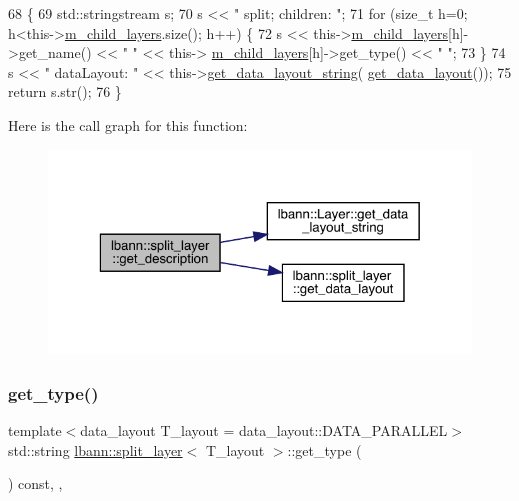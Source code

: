 \begin{DoxyCode}
68                                              \{
69     std::stringstream s;
70     s << \textcolor{stringliteral}{" split; children: "};
71     \textcolor{keywordflow}{for} (\textcolor{keywordtype}{size\_t} h=0; h<this->\hyperlink{classlbann_1_1Layer_ae348c0d2b4d05f74d809d09debb633c0}{m\_child\_layers}.size(); h++) \{
72       s << this->\hyperlink{classlbann_1_1Layer_ae348c0d2b4d05f74d809d09debb633c0}{m\_child\_layers}[h]->get\_name() << \textcolor{stringliteral}{" "} << this->
      \hyperlink{classlbann_1_1Layer_ae348c0d2b4d05f74d809d09debb633c0}{m\_child\_layers}[h]->get\_type() << \textcolor{stringliteral}{" "};
73     \}
74     s << \textcolor{stringliteral}{" dataLayout: "} << this->\hyperlink{classlbann_1_1Layer_ae3f4a5602df821f4221614b1e3782dc1}{get\_data\_layout\_string}(
      \hyperlink{classlbann_1_1split__layer_ad206038eac236a971664ccacec8faa82}{get\_data\_layout}());
75     \textcolor{keywordflow}{return} s.str();
76   \}
\end{DoxyCode}
Here is the call graph for this function\+:\nopagebreak
\begin{figure}[H]
\begin{center}
\leavevmode
\includegraphics[width=323pt]{classlbann_1_1split__layer_a3e599c39385b1d707ad9f28454f52cf5_cgraph}
\end{center}
\end{figure}
\mbox{\label{classlbann_1_1split__layer_a3c0863c5c28e69f09fa586f8ff57c757}} 
\subsubsection{\texorpdfstring{get\+\_\+type()}{get\_type()}}
{\footnotesize\ttfamily template$<$data\+\_\+layout T\+\_\+layout = data\+\_\+layout\+::\+D\+A\+T\+A\+\_\+\+P\+A\+R\+A\+L\+L\+EL$>$ \\
std\+::string \hyperlink{classlbann_1_1split__layer}{lbann\+::split\+\_\+layer}$<$ T\+\_\+layout $>$\+::get\+\_\+type (\begin{DoxyParamCaption}{ }\end{DoxyParamCaption}) const\hspace{0.3cm}{\ttfamily [inline]}, {\ttfamily [override]}, {\ttfamily [virtual]}}

